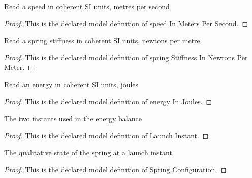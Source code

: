 \begin{definition}
  \label{def:physics:phyx-mini-0694:phyxminiproblems-problemphyxmini0694-speedinmeterspersecond}
  Read a speed in coherent SI units, metres per second
\end{definition}
\begin{proof}
  This is the declared model definition of speed In Meters Per Second.
\end{proof}
\begin{definition}
  \label{def:physics:phyx-mini-0694:phyxminiproblems-problemphyxmini0694-springstiffnessinnewtonspermeter}
  Read a spring stiffness in coherent SI units, newtons per metre
\end{definition}
\begin{proof}
  This is the declared model definition of spring Stiffness In Newtons Per Meter.
\end{proof}
\begin{definition}
  \label{def:physics:phyx-mini-0694:phyxminiproblems-problemphyxmini0694-energyinjoules}
  Read an energy in coherent SI units, joules
\end{definition}
\begin{proof}
  This is the declared model definition of energy In Joules.
\end{proof}
\begin{definition}
  \label{def:physics:phyx-mini-0694:phyxminiproblems-problemphyxmini0694-launchinstant}
  The two instants used in the energy balance
\end{definition}
\begin{proof}
  This is the declared model definition of Launch Instant.
\end{proof}
\begin{definition}
  \label{def:physics:phyx-mini-0694:phyxminiproblems-problemphyxmini0694-springconfiguration}
  The qualitative state of the spring at a launch instant
\end{definition}
\begin{proof}
  This is the declared model definition of Spring Configuration.
\end{proof}
